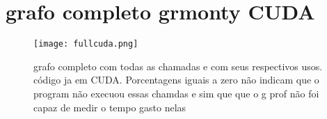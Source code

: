 \chapter{grafo completo grmonty CUDA}
\label{cap:ape}

\begin{sidewaysfigure}[!h]
  \centering
  \texttt{[image: fullcuda.png]}
  \caption{grafo completo com todas as chamadas e com seus respectivos usos. código ja em CUDA. Porcentagens iguais a zero não indicam que o program não execuou essas chamdas e sim que que o g prof não foi capaz de medir o tempo gasto nelas}
  \label{fig:fullcuda}
\end{sidewaysfigure}
